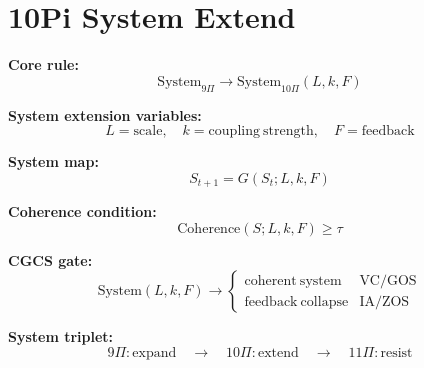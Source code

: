 \section*{10Pi System Extend}

\textbf{Core rule:}
\[
\mathrm{System}_{9\Pi}
\rightarrow
\mathrm{System}_{10\Pi}(L,k,F)
\]

\textbf{System extension variables:}
\[
L = \mathrm{scale}, \quad k = \mathrm{coupling\ strength}, \quad F = \mathrm{feedback}
\]

\textbf{System map:}
\[
S_{t+1} = G(S_t; L,k,F)
\]

\textbf{Coherence condition:}
\[
\mathrm{Coherence}(S; L,k,F) \geq \tau
\]

\textbf{CGCS gate:}
\[
\mathrm{System}(L,k,F) \rightarrow
\begin{cases}
\mathrm{coherent\ system} & \text{VC/GOS} \\
\mathrm{feedback\ collapse} & \text{IA/ZOS}
\end{cases}
\]

\textbf{System triplet:}
\[
9\Pi:\mathrm{expand}
\quad\rightarrow\quad
10\Pi:\mathrm{extend}
\quad\rightarrow\quad
11\Pi:\mathrm{resist}
\]

